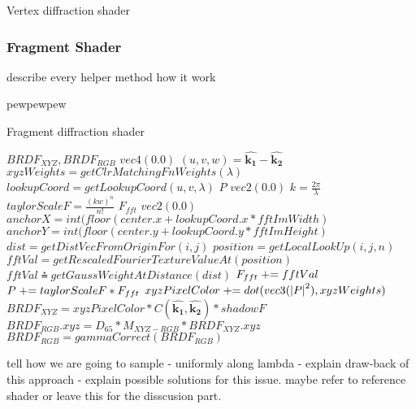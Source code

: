 \begin{algorithm}
  \caption{Vertex diffraction shader}
  \begin{algorithmic}
    \EndFor
  \end{algorithmic}
\end{algorithm}


\subsubsection{Fragment Shader}


describe every helper method how it work

pewpewpew

\begin{algorithm}
  \caption{Fragment diffraction shader}
  \begin{algorithmic}
      \State \init $BRDF_{XYZ}, BRDF_{RGB}$ \to $vec4(0.0)$
      \State $(u,v,w) = \hat{\mathbf{k_1}}-\hat{\mathbf{k_2}}$
        \State $xyzWeights = getClrMatchingFnWeights(\lambda)$
        \State $lookupCoord = getLookupCoord(u, v, \lambda)$
        \State \init $P$ \to $vec2(0.0)$
        \State $k = \frac{2\pi}{\lambda}$
          \State $taylorScaleF = \frac{(kw)^n}{n!}$
          \State \init $F_{fft}$  \to $vec2(0.0)$
          \State $anchorX = int(floor(center.x + lookupCoord.x * fftImWidth)$
          \State $anchorY = int(floor(center.y + lookupCoord.y * fftImHeight)$
              \State $dist = getDistVecFromOriginFor(i,j)$
              \State $position = getLocalLookUp(i,j,n)$
              \State $fftVal = getRescaledFourierTextureValueAt(position)$
              \State $fftVal \asteq getGaussWeightAtDistance(dist)$
              \State $F_{fft} \mathrel{+}= fftVal$
            \EndFor
          \EndFor
          \State $P \mathrel{+}= taylorScaleF*F_{fft}$
        \EndFor
        \State $xyzPixelColor \mathrel{+}= dot(vec3(\left|P\right|^2), xyzWeights)$
      \EndFor
      \State $BRDF_{XYZ} = xyzPixelColor*C(\hat{\mathbf{k_1}},\hat{\mathbf{k_2}})*shadowF$
      \State $BRDF_{RGB}.xyz = D_{65}*M_{XYZ-RGB}*BRDF_{XYZ}.xyz$
      \State $BRDF_{RGB}= gammaCorrect(BRDF_{RGB})$
    \EndFor
  \end{algorithmic}
\end{algorithm}



tell how we are going to sample - uniformly along lambda - explain draw-back of this approach - explain possible solutions for this issue. maybe refer to reference shader or leave this for the disscusion part.